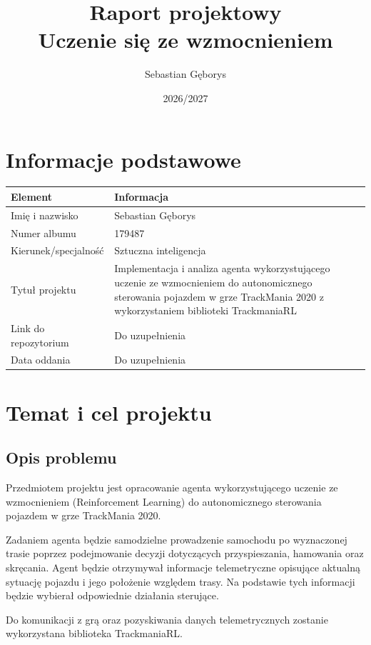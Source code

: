 \documentclass[12pt]{article}
\title{Raport projektowy\\Uczenie się ze wzmocnieniem}
\author{Sebastian Gęborys}
\date{2026/2027}
\begin{document}
\maketitle
\tableofcontents
\newpage

\section{Informacje podstawowe}

\begin{center}
\begin{tabular}{p{}p{}}
\toprule
Element & Informacja \\
\midrule
Imię i nazwisko & Sebastian Gęborys \\
Numer albumu & 179487 \\
Kierunek/specjalność & Sztuczna inteligencja \\
Tytuł projektu & Implementacja i analiza agenta wykorzystującego uczenie ze wzmocnieniem do autonomicznego sterowania pojazdem w grze TrackMania 2020 z wykorzystaniem biblioteki TrackmaniaRL \\
Link do repozytorium & Do uzupełnienia \\
Data oddania & Do uzupełnienia \\
\bottomrule
\end{tabular}
\end{center}

\section{Temat i cel projektu}

\subsection{Opis problemu}

Przedmiotem projektu jest opracowanie agenta wykorzystującego uczenie ze wzmocnieniem (Reinforcement Learning) do autonomicznego sterowania pojazdem w grze TrackMania 2020.

Zadaniem agenta będzie samodzielne prowadzenie samochodu po wyznaczonej trasie poprzez podejmowanie decyzji dotyczących przyspieszania, hamowania oraz skręcania. Agent będzie otrzymywał informacje telemetryczne opisujące aktualną sytuację pojazdu i jego położenie względem trasy. Na podstawie tych informacji będzie wybierał odpowiednie działania sterujące.

Do komunikacji z grą oraz pozyskiwania danych telemetrycznych zostanie wykorzystana biblioteka TrackmaniaRL.
\end{document}
